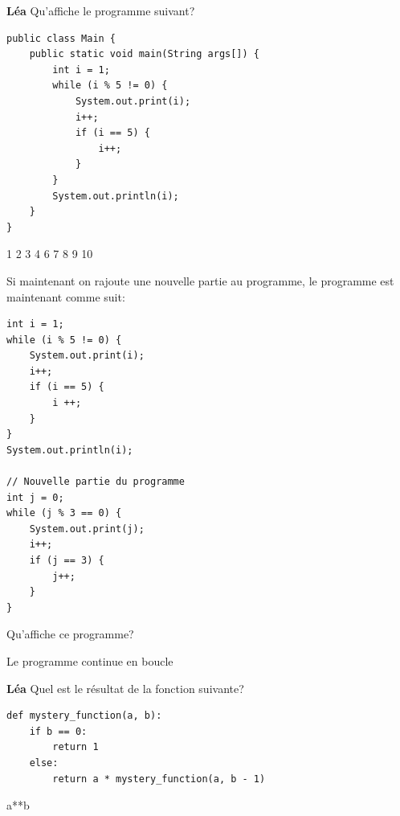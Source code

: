 \begin{Exercice}[5 minutes]\textbf{Léa}
Qu'affiche le programme suivant?

\begin{lstlisting}[style=javastyle]
public class Main {
    public static void main(String args[]) {
        int i = 1;
        while (i % 5 != 0) {
            System.out.print(i);
            i++;
            if (i == 5) {
                i++;
            }
        }
        System.out.println(i);
    }
}
\end{lstlisting}

\begin{solution}
 1 2 3 4 6 7 8 9 10
\end{solution}

Si maintenant on rajoute une nouvelle partie au programme, le programme est maintenant comme suit: \newline 

\begin{lstlisting}[style=javastyle]
int i = 1;
while (i % 5 != 0) {
    System.out.print(i);
    i++;
    if (i == 5) {
        i ++;
    }
}
System.out.println(i);
        
// Nouvelle partie du programme 
int j = 0;
while (j % 3 == 0) {
    System.out.print(j);
    i++;
    if (j == 3) {
        j++;
    }
}
\end{lstlisting}

Qu'affiche ce programme?


\begin{solution}
Le programme continue en boucle
\end{solution}

\end{Exercice}


\begin{Exercice}[5 minutes]\textbf{Léa}
Quel est le résultat de la fonction suivante?

\begin{lstlisting}[style=pythonstyle]
def mystery_function(a, b):
    if b == 0:
        return 1
    else:
        return a * mystery_function(a, b - 1)
\end{lstlisting}


\begin{solution}
a**b
\end{solution}

\end{Exercice}


